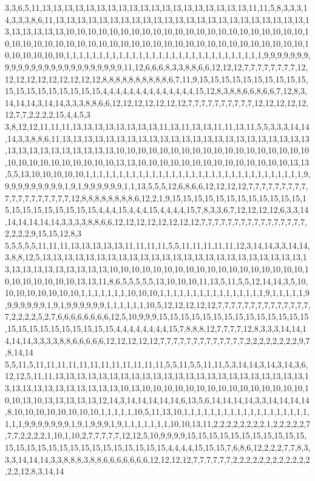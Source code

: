 3,3,6,5,11,13,13,13,13,13,13,13,13,13,13,13,13,13,13,13,13,13,13,13,11,11,5,8,3,3,3,14,3,3,3,8,6,11,13,13,13,13,13,13,13,13,13,13,13,13,13,13,13,13,13,13,13,13,13,13,13,13,13,13,13,13,13,10,10,10,10,10,10,10,10,10,10,10,10,10,10,10,10,10,10,10,10,10,10,10,10,10,10,10,10,10,10,10,10,10,10,10,10,10,10,10,10,10,10,10,10,10,10,10,10,10,10,10,10,10,10,10,10,1,1,1,1,1,1,1,1,1,1,1,1,1,1,1,1,1,1,1,1,1,1,1,1,1,1,1,1,1,1,9,9,9,9,9,9,9,9,9,9,9,9,9,9,9,9,9,9,9,9,9,9,9,9,9,11,12,6,6,6,8,3,3,8,8,6,6,12,12,12,7,7,7,7,7,7,7,7,12,12,12,12,12,12,12,12,12,12,8,8,8,8,8,8,8,8,8,8,6,7,11,9,15,15,15,15,15,15,15,15,15,15,15,15,15,15,15,15,15,15,15,4,4,4,4,4,4,4,4,4,4,4,4,4,4,15,12,8,3,8,8,6,6,8,6,6,7,12,8,3,14,14,14,3,14,14,3,3,3,8,8,6,6,12,12,12,12,12,12,12,7,7,7,7,7,7,7,7,7,7,12,12,12,12,12,12,7,7,2,2,2,2,15,4,4,5,3
3,8,12,12,11,11,11,13,13,13,13,13,13,13,13,11,13,11,13,13,11,11,13,11,5,5,3,3,3,14,14,14,3,3,8,8,6,11,13,13,13,13,13,13,13,13,13,13,13,13,13,13,13,13,13,13,13,13,13,13,13,13,13,13,13,13,13,13,13,13,13,10,10,10,10,10,10,10,10,10,10,10,10,10,10,10,10,10,10,10,10,10,10,10,10,10,10,10,10,13,13,10,10,10,10,10,10,10,10,10,10,10,10,10,10,13,13,5,5,13,10,10,10,10,10,1,1,1,1,1,1,1,1,1,1,1,1,1,1,1,1,1,1,1,1,1,1,1,1,1,1,1,1,1,1,1,1,1,9,9,9,9,9,9,9,9,9,9,1,9,1,9,9,9,9,9,9,1,1,13,5,5,5,12,6,8,6,6,12,12,12,12,7,7,7,7,7,7,7,7,7,7,7,7,7,7,7,7,7,7,7,12,8,8,8,8,8,8,8,8,6,12,2,1,9,15,15,15,15,15,15,15,15,15,15,15,15,15,15,15,15,15,15,15,15,15,4,4,4,15,4,4,4,15,4,4,4,4,15,7,8,3,3,6,7,12,12,12,12,6,3,3,14,14,14,14,14,14,3,3,3,3,8,8,6,6,12,12,12,12,12,12,12,12,7,7,7,7,7,7,7,7,7,7,7,7,7,7,7,7,2,2,2,2,9,15,15,12,8,3
5,5,5,5,5,11,11,11,13,13,13,13,13,11,11,11,11,5,5,11,11,11,11,11,12,3,14,14,3,3,14,14,3,8,8,12,5,13,13,13,13,13,13,13,13,13,13,13,13,13,13,13,13,13,13,13,13,13,13,13,13,13,13,13,13,13,13,13,13,13,13,10,10,10,10,10,10,10,10,10,10,10,10,10,10,10,10,10,10,10,10,10,10,10,10,10,13,13,11,8,6,5,5,5,5,5,13,10,10,10,11,13,5,11,5,5,12,14,14,3,5,10,10,10,10,10,10,10,10,1,1,1,1,1,1,1,10,10,10,1,1,1,1,1,1,1,1,1,1,1,1,1,1,1,1,9,1,1,1,1,1,9,9,9,9,9,9,9,1,9,1,9,9,9,9,9,9,1,1,1,1,1,1,10,5,12,12,12,12,12,7,7,7,7,7,7,7,7,7,7,7,7,7,7,7,2,2,2,2,5,2,7,6,6,6,6,6,6,6,6,12,5,10,9,9,9,15,15,15,15,15,15,15,15,15,15,15,15,15,15,15,15,15,15,15,15,15,15,15,15,4,4,4,4,4,4,4,4,15,7,8,8,8,12,7,7,7,7,12,8,3,3,3,14,14,14,14,14,3,3,3,3,8,8,6,6,6,6,6,12,12,12,12,12,7,7,7,7,7,7,7,7,7,7,7,7,7,2,2,2,2,2,2,2,2,9,7,8,14,14
5,5,11,5,11,11,11,11,11,11,11,11,11,11,11,11,5,5,11,5,5,11,11,5,3,14,14,3,14,3,14,3,6,12,12,5,11,11,13,13,13,13,13,13,13,13,13,13,13,13,13,13,13,13,13,13,13,13,13,13,13,13,13,13,13,13,13,13,13,13,13,13,10,13,10,10,10,10,10,10,10,10,10,10,10,10,10,10,10,10,10,13,10,13,13,13,13,13,12,14,3,14,14,14,14,14,6,13,5,6,14,14,14,14,3,3,14,14,14,14,8,10,10,10,10,10,10,10,10,1,1,1,1,1,10,5,11,13,10,1,1,1,1,1,1,1,1,1,1,1,1,1,1,1,1,1,1,1,1,1,1,9,9,9,9,9,9,9,1,9,1,9,9,9,1,9,1,1,1,1,1,1,1,10,10,13,11,2,2,2,2,2,2,2,2,1,2,2,2,2,2,7,7,7,2,2,2,2,1,10,1,10,2,7,7,7,7,7,12,12,5,10,9,9,9,9,15,15,15,15,15,15,15,15,15,15,15,15,15,15,15,15,15,15,15,15,15,15,15,15,15,15,4,4,4,4,15,15,15,7,6,8,6,12,2,2,2,7,7,8,3,3,3,14,14,14,3,3,8,8,8,3,8,8,6,6,6,6,6,6,6,12,12,12,12,7,7,7,7,7,7,2,2,2,2,2,2,2,2,2,2,2,2,2,2,12,8,3,14,14
